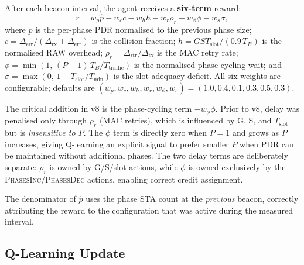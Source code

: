 \documentclass[conference]{IEEEtran}
\begin{document}
After each beacon interval, the agent receives a \textbf{six-term} reward:
\begin{equation}
  r = w_p \hat{p} - w_c c - w_h h
      - w_r \rho_r - w_\phi \phi - w_s \sigma,
  \label{eq:reward}
\end{equation}
where $\hat{p}$ is the per-phase PDR normalised to the previous phase size;
$c = \Delta_\text{err}/(\Delta_\text{rx}+\Delta_\text{err})$ is the collision
fraction; $h = G S T_\text{slot}/(0.9\,T_B)$ is the normalised RAW overhead;
$\rho_r = \Delta_\text{rtr}/\Delta_\text{tx}$ is the MAC retry rate;
$\phi = \min(1,\,(P-1)\,T_B/T_\text{traffic})$ is the normalised
phase-cycling wait; and
$\sigma = \max(0,\,1 - T_\text{slot}/T_\text{min})$ is the slot-adequacy
deficit.
All six weights are configurable; defaults are
$(w_p, w_c, w_h, w_r, w_\phi, w_s) = (1.0, 0.4, 0.1, 0.3, 0.5, 0.3)$.

The critical addition in v8 is the phase-cycling term $-w_\phi \phi$.
Prior to v8, delay was penalised only through $\rho_r$ (MAC retries), which
is influenced by G, S, and $T_\text{slot}$ but is \emph{insensitive to $P$}.
The $\phi$ term is directly zero when $P = 1$ and grows as $P$ increases,
giving Q-learning an explicit signal to prefer smaller $P$ when PDR can be
maintained without additional phases.
The two delay terms are deliberately separate: $\rho_r$ is owned by
G/S/slot actions, while $\phi$ is owned exclusively by the
\textsc{PhasesInc}/\textsc{PhasesDec} actions, enabling correct credit
assignment.

The denominator of $\hat{p}$ uses the phase STA count at the \emph{previous}
beacon, correctly attributing the reward to the configuration that was active
during the measured interval.

\subsection{Q-Learning Update}
\end{document}
